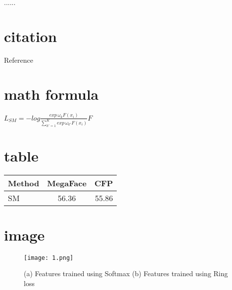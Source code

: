 \documentclass[10pt,twocolumn,letterpaper]{article}
\begin{document}
......

\section{citation}
Reference\cite{zheng2018ring}

\section{math formula}
$ L_{SM} = -log\frac{exp\, \omega _{k} F\left ( x_{i} \right )}{\sum ^{K}_{k'=1} exp\, \omega _{k'} F\left ( x_{i} \right )} F $

\section{table}

\begin{table}[h]
\begin{tabular}{|l|c|r|}
\hline
Method&MegaFace&CFP\\
\hline
SM&56.36&55.86\\
\hline
\end{tabular}
\end{table}

\section{image}

\begin{figure}[h]
	\centering
	\texttt{[image: 1.png]}  
	\caption{(a) Features trained using Softmax (b) Features trained using Ring loss}
\end{figure}

{\small


}
\end{document}
